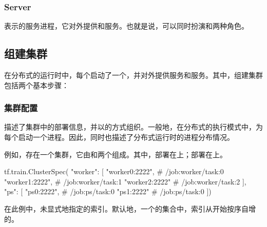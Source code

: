 \begin{content}
\subsubsection{Server}

表示的服务进程，它对外提供和服务。也就是说，可以同时扮演和两种角色。

\subsection{组建集群}

在分布式的\tf{}运行时中，每个启动了一个，并对外提供服务和服务。其中，组建集群包括两个基本步骤：

\begin{enum}
\end{enum}

\subsubsection{集群配置}

描述了集群中的部署信息，并以的方式组织。一般地，在分布式的执行模式中，为每个启动一个进程。因此，同时也描述了分布式运行时的进程分布情况。

例如，存在一个集群，它由和两个组成。其中，部署在上；部署在上。

\begin{leftbar}
\begin{python}
tf.train.ClusterSpec({
  "worker": [
    "worker0:2222",   # /job:worker/task:0
    "worker1:2222",   # /job:worker/task:1
    "worker2:2222"    # /job:worker/task:2
  ],  
  "ps": [
    "ps0:2222",       # /job:ps/task:0
    "ps1:2222"        # /job:ps/task:0
  ]})
\end{python}
\end{leftbar}

在此例中，未显式地指定的索引。默认地，一个的集合中，索引从开始按序自增的。


\end{content}
